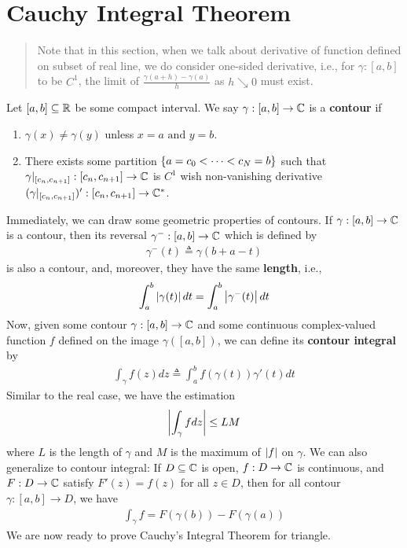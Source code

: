\documentclass{report}
\begin{document}
\section{Cauchy Integral Theorem}
\begin{abstract}
Note that in this section, when we talk about derivative of function defined on subset of real line, we do consider one-sided derivative, i.e., for $\gamma :[a,b]$ to be $C^1$, the limit of $\frac{\gamma (a+h)-\gamma  (a)}{h}$ as $h\searrow 0$ must exist. 
\end{abstract}
\begin{mdframed}
Let $[a,b]\subseteq \mathbb{R}$ be some compact interval. We say $\gamma :[a,b]\rightarrow \mathbb{C}$ is a \textbf{contour} if 
\begin{enumerate}[label=(\alph*)]
  \item $\gamma (x)\neq \gamma (y)$ unless $x=a\text{ and }y=b$. 
  \item There exists some partition $\{ a=c_0<\cdots <c_N=b \}$ such that $\gamma|_{[c_n,c_{n+1}]}:[c_n,c_{n+1}]\rightarrow \mathbb{C}$ is $C^1$ wish non-vanishing derivative $(\gamma |_{[c_n,c_{n+1}]})':[c_n,c_{n+1}]\rightarrow \mathbb{C}^*$.  
\end{enumerate}
Immediately, we can draw some geometric properties of contours. If $\gamma :[a,b]\rightarrow \mathbb{C}$ is a contour, then its reversal $\gamma ^-:[a,b]\rightarrow \mathbb{C}$ which is defined by 
\begin{align*}
\gamma^-(t)\triangleq \gamma (b+a-t)
\end{align*}
is also a contour, and, moreover, they have the same \textbf{length}, i.e., 
\begin{align*}
\int_a^b \left|\gamma (t)\right|dt = \int_a^b \left|\gamma ^-(t)\right|dt
\end{align*}
Now, given some contour $\gamma :[a,b]\rightarrow \mathbb{C}$ and some continuous complex-valued function $f$ defined on the image $\gamma ([a,b])$, we can define its \textbf{contour integral} by 
\begin{align*}
\int_\gamma f(z)dz \triangleq \int_a^b f(\gamma  (t))\gamma  '(t)dt
\end{align*}
Similar to the real case, we have the estimation  
\begin{align*}
\left|\int_{\gamma}fdz\right|\leq LM
\end{align*}
where $L$ is the length of  $\gamma $ and $M$ is the maximum of  $\left|f\right|$ on $\gamma $. We can also generalize  to contour integral: If $D\subseteq \mathbb{C}$ is open, $f:D\rightarrow \mathbb{C}$ is continuous, and $F:D\rightarrow \mathbb{C}$ satisfy $F'(z)=f(z)$ for all $z\in D$, then for all contour $\gamma :[a,b]\rightarrow D$, we have 
\begin{align*}
\int_{\gamma }f=F(\gamma (b))-F(\gamma (a))
\end{align*}
We are now ready to prove Cauchy's Integral Theorem for triangle.  
\end{mdframed}
\end{document}
